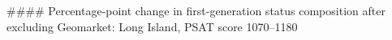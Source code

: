 #### Percentage-point change in first-generation status composition after excluding Geomarket: Long Island, PSAT score 1070–1180
